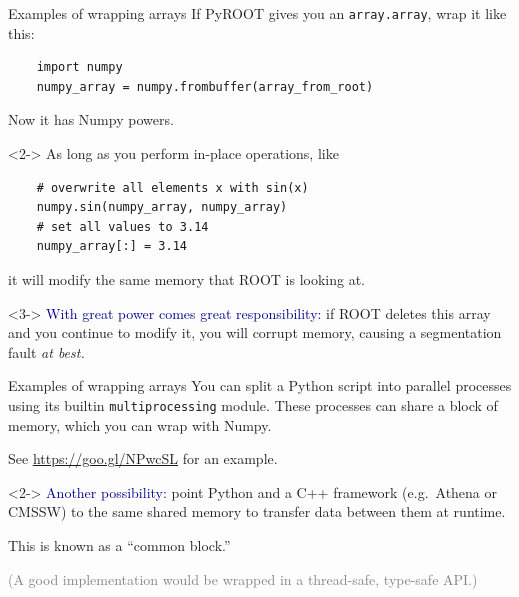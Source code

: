 \documentclass{beamer}
\begin{document}
\begin{frame}[fragile]{Examples of wrapping arrays}
\vspace{0.25 cm}
If PyROOT gives you an {\tt array.array}, wrap it like this:

\small
\begin{verbatim}
    import numpy
    numpy_array = numpy.frombuffer(array_from_root)
\end{verbatim}

\normalsize
Now it has Numpy powers.

\begin{uncoverenv}<2->
\vspace{0.25 cm}
As long as you perform in-place operations, like

\small
\begin{verbatim}
    # overwrite all elements x with sin(x)
    numpy.sin(numpy_array, numpy_array)
    # set all values to 3.14
    numpy_array[:] = 3.14
\end{verbatim}

\normalsize
it will modify the same memory that ROOT is looking at.
\end{uncoverenv}

\begin{uncoverenv}<3->
\vspace{0.25 cm}
\textcolor{darkblue}{With great power comes great responsibility:} if ROOT deletes this array and you continue to modify it, you will corrupt memory, causing a segmentation fault {\it at best.}
\end{uncoverenv}
\end{frame}

\begin{frame}[fragile]{Examples of wrapping arrays}
\vspace{0.25 cm}
You can split a Python script into parallel processes using its builtin {\tt multiprocessing} module. These processes can share a block of memory, which you can wrap with Numpy.

\vspace{0.25 cm}
See \textcolor{blue}{\underline{\url{https://goo.gl/NPwcSL}}} for an example.

\vfill
\begin{uncoverenv}<2->
\textcolor{darkblue}{Another possibility:} point Python and a C++ framework (e.g.\ Athena or CMSSW) to the same shared memory to transfer data between them at runtime.

\vspace{0.25 cm}
This is known as a ``common block.''

\vspace{0.25 cm}
\textcolor{gray}{(A good implementation would be wrapped in a thread-safe, type-safe API.)}
\end{uncoverenv}
\end{frame}
\end{document}
